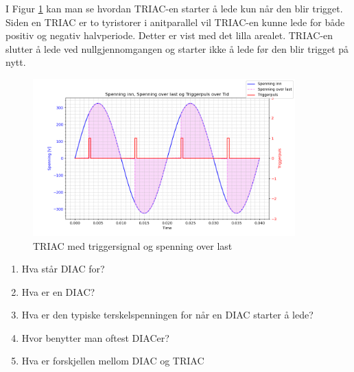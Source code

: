 \begin{solution}[name=Løsningsforslag]
	I Figur \ref{fig:triacTriggplotSOL} kan man se hvordan TRIAC-en starter å lede kun når den blir trigget. Siden en TRIAC er to tyristorer i anitparallel vil TRIAC-en kunne lede for både positiv og negativ halvperiode. Detter er vist med det lilla arealet. TRIAC-en slutter å lede ved nullgjennomgangen og starter ikke å lede før den blir trigget på nytt.
	
	\begin{figure}[H]
		\centering
		\includegraphics[width=0.9\textwidth]{tyristor/plot/triacSOL.png}
		\caption{TRIAC med triggersignal og spenning over last}
		\label{fig:triacTriggplotSOL}
	\end{figure}
	
\end{solution}



\begin{question}[name=Spørsmål, topic=tyristor]
	\begin{enumerate}[label=\roman*)]
	\item Hva står DIAC for?
	\item Hva er en DIAC?
	\item Hva er den typiske terskelspenningen for når en DIAC starter å lede?
	\item Hvor benytter man oftest DIACer?
	\item Hva er forskjellen mellom DIAC og TRIAC
	\end{enumerate}

\end{question}

\vspace{0.5cm} %

